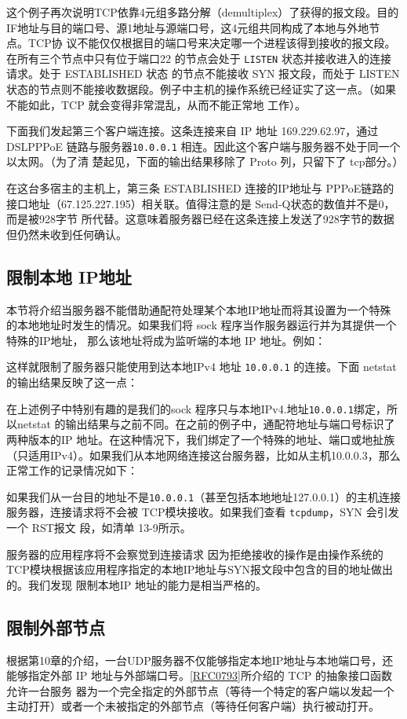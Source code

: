 这个例子再次说明TCP依靠4元组多路分解（demultiplex）了获得的报文段。目的IF地址与目的端口号、源1地址与源端口号，这4元组共同构成了本地与外地节点。TCP协
议不能仅仅根据目的端口号来决定哪一个进程该得到接收的报文段。在所有三个节点中只有位于端口22 的节点会处于 \verb|LISTEN|
状态并接收进入的连接请求。处于 ESTABLISHED 状态
的节点不能接收 SYN 报文段，而处于 LISTEN
状态的节点则不能接收数据段。例子中主机的操作系统已经证实了这一点。（如果不能如此，TCP 就会变得非常混乱，从而不能正常地
工作）。

下面我们发起第三个客户端连接。这条连接来自 IP 地址 169.229.62.97，通过DSLPPPoE
链路与服务器\verb|10.0.0.1| 相连。因此这个客户端与服务器不处于同一个以太网。（为了清
楚起见，下面的输出结果移除了 Proto 列，只留下了 tcp部分。）

在这台多宿主的主机上，第三条 ESTABLISHED 连接的IP地址与
PPPoE链路的接口地址（67.125.227.195）相关联。值得注意的是 Send-Q状态的数值并不是0，而是被928字节
所代替。这意味着服务器已经在这条连接上发送了928字节的数据但仍然未收到任何确认。
\subsection{限制本地 IP地址}
本节将介绍当服务器不能借助通配符处理某个本地IP地址而将其设置为一个特殊的本地地址时发生的情况。如果我们将 sock
程序当作服务器运行并为其提供一个特殊的IP地址，
那么该地址将成为监听端的本地 IP 地址。例如：

这样就限制了服务器只能使用到达本地IPv4 地址 \verb|10.0.0.1| 的连接。下面 netstat 的输出结果反映了这一点：

在上述例子中特别有趣的是我们的sock 程序只与本地IPv4.地址\verb|10.0.0.1|绑定，所以netstat
的输出结果与之前不同。在之前的例子中，通配符地址与端口号标识了两种版本的IP
地址。在这种情况下，我们绑定了一个特殊的地址、端口或地扯族（只适用IPv4）。如果我们从本地网络连接这台服务器，比如从主机10.0.0.3，那么正常工作的记录情况如下：

如果我们从一台目的地址不是\verb|10.0.0.1|（甚至包括本地地址127.0.0.1）的主机连接服务器，连接请求将不会被
TCP模块接收。如果我们查看 \verb|tcpdump|，SYN 会引发一个 RST报文
段，如清单 13-9所示。

服务器的应用程序将不会察觉到连接请求\textemdash
因为拒绝接收的操作是由操作系统的TCP模块根据该应用程序指定的本地IP地址与SYN报文段中包含的目的地址做出的。我们发现
限制本地IP 地址的能力是相当严格的。
\subsection{限制外部节点}
根据第10章的介绍，一台UDP服务器不仅能够指定本地IP地址与本地端口号，还能够指定外部 IP
地址与外部端口号。\href{https://www.rfc-editor.org/rfc/rfc0793}{[RFC0793]}所介绍的
TCP 的抽象接口函数允许一台服务
器为一个完全指定的外部节点（等待一个特定的客户端以发起一个主动打开）或者一个未被指定的外部节点（等待任何客户端）执行被动打开。

